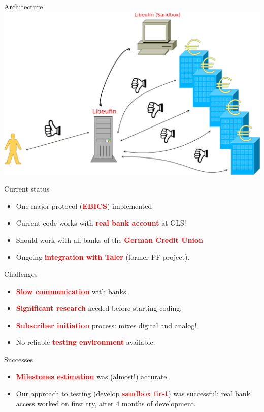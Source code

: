 \documentclass[pdf, aspectratio=169]{beamer}
\newcommand{\boldred}[1]{\textcolor{red}{\textbf{#1}}}
\begin{document}
\begin{frame}{Architecture}
  \includegraphics[height=0.63\textheight]{libeufin.png}
\end{frame}

\begin{frame}{Current status}
  \begin{itemize}
    \item One major protocol (\boldred{EBICS}) implemented
    \item Current code works with \boldred{real bank account} at GLS!
    \item Should work with all banks of the \boldred{German Credit Union}
    \item Ongoing \boldred{integration with Taler} (former PF project).
  \end{itemize}
\end{frame}

\begin{frame}{Challenges}
  \begin{itemize}
    \item \boldred{Slow communication} with banks.
    \item \boldred{Significant research} needed before starting coding.
    \item \boldred{Subscriber initiation} process: mixes digital and analog!
    \item No reliable \boldred{testing environment} available.
  \end{itemize}
\end{frame}

\begin{frame}{Successes}
  \begin{itemize}
    \item \boldred{Milestones estimation} was (almost!) accurate.
    \item Our approach to testing (develop \boldred{sandbox first}) was successful: real bank access
          worked on first try, after 4 months of development.
  \end{itemize}
\end{frame}
\end{document}
